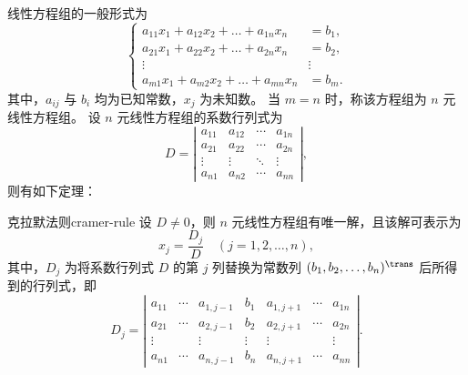 线性方程组的一般形式为
\begin{equation}
    \left\{ \begin{aligned}
        a_{11} x_1 + a_{12} x_2 + \ldots + a_{1n} x_n & = b_1 , \\
        a_{21} x_1 + a_{22} x_2 + \ldots + a_{2n} x_n & = b_2 , \\
        \vdots                                        & \vdots  \\
        a_{m1} x_1 + a_{m2} x_2 + \ldots + a_{mn} x_n & = b_m .
    \end{aligned} \right.
\end{equation}
其中，$ a_{ij} $ 与 $ b_i $ 均为已知常数，$ x_j $ 为未知数。
当 $ m = n $ 时，称该方程组为 $ n $ 元线性方程组。
设 $ n $ 元线性方程组的系数行列式为
\begin{equation}
    D = \left| \begin{array}{cccc}
        a_{11} & a_{12} & \cdots & a_{1n} \\
        a_{21} & a_{22} & \cdots & a_{2n} \\
        \vdots & \vdots & \ddots & \vdots \\
        a_{n1} & a_{n2} & \cdots & a_{nn}
    \end{array} \right| ,
\end{equation}
则有如下定理：
\begin{theorem}{克拉默法则}{cramer-rule}
    设 $ D \neq 0 $，则 $ n $ 元线性方程组有唯一解，且该解可表示为
    \begin{equation}
        x_j = \frac{D_j}{D} \quad (j = 1, 2, \ldots , n) ,
    \end{equation}
    其中，$ D_j $ 为将系数行列式 $ D $ 的第 $ j $ 列替换为常数列 $ (b_1 , b_2 , \ldots , b_n)^{\trans} $ 后所得到的行列式，即
    \begin{equation}
        D_j = \left| \begin{array}{ccccccc}
            a_{11} & \cdots & a_{1,j-1} & b_1    & a_{1,j+1} & \cdots & a_{1n} \\
            a_{21} & \cdots & a_{2,j-1} & b_2    & a_{2,j+1} & \cdots & a_{2n} \\
            \vdots &        & \vdots    & \vdots & \vdots    &        & \vdots \\
            a_{n1} & \cdots & a_{n,j-1} & b_n    & a_{n,j+1} & \cdots & a_{nn}
        \end{array} \right| .
    \end{equation}
\end{theorem}

